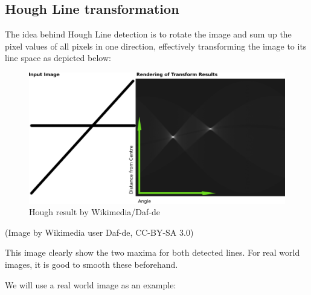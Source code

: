 \documentclass[11pt,a4paper, d]{scrartcl}
\begin{document}
    \hypertarget{hough-line-transformation}{%
\subsection{Hough Line transformation}\label{hough-line-transformation}}

The idea behind Hough Line detection is to rotate the image and sum up
the pixel values of all pixels in one direction, effectively
transforming the image to its line space as depicted below:

\begin{figure}
\centering
\includegraphics{figures/Hough.png}
\caption{Hough result by Wikimedia/Daf-de}
\end{figure}

(Image by Wikimedia user Daf-de, CC-BY-SA 3.0)

This image clearly show the two maxima for both detected lines. For real
world images, it is good to smooth these beforehand.

We will use a real world image as an example:
\end{document}

